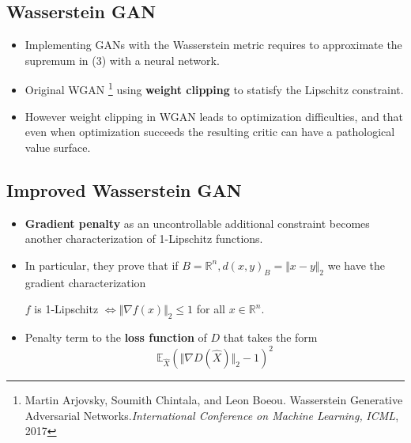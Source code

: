 \documentclass[landscape,headrule,footrule]{foils}
\begin{document}
\subsection{Wasserstein GAN}
\tableofcontents
\begin{frame}
\begin{flushleft}
\begin{itemize}
\item Implementing GANs with the Wasserstein metric requires to approximate the supremum in (3) with a neural network.
\\
\item Original WGAN \footnote{Martin Arjovsky, Soumith Chintala, and Leon Boeou. Wasserstein Generative Adversarial Networks.\textit{International Conference on Machine Learning,} \textsl{ICML}, 2017} using \textbf{weight clipping} to statisfy the Lipschitz constraint.
\\
\item However weight clipping in WGAN leads to optimization difficulties, and that even when optimization succeeds the resulting critic can have a pathological value surface.
\end{itemize}
\end{flushleft}
\end{frame}

\subsection{Improved Wasserstein GAN}
\tableofcontents
\begin{frame}
\begin{flushleft}
\begin{itemize}
\item \textbf{Gradient penalty} as an uncontrollable additional constraint becomes another characterization of 1-Lipschitz functions.
\\
\item In particular, they prove that if $B=\mathbb{R}^n, d(x,y)_B=\Vert x-y \Vert_2$ we have the gradient characterization
\begin{center}
	$f$ is 1-Lipschitz $\Longleftrightarrow \Vert \nabla f(x) \Vert_2 \leq 1$ for all $x\in \mathbb{R}^n$. \\
\end{center}	
\item Penalty term to the \textbf{loss function} of $D$ that takes the form
\begin{equation}
\mathbb{E}_{\widehat{X}} \left( \Vert \nabla D(\widehat{X}) \Vert_2 -1 \right)^2
\end{equation}
\end{itemize}
\end{flushleft}
\end{frame}
\end{document}
